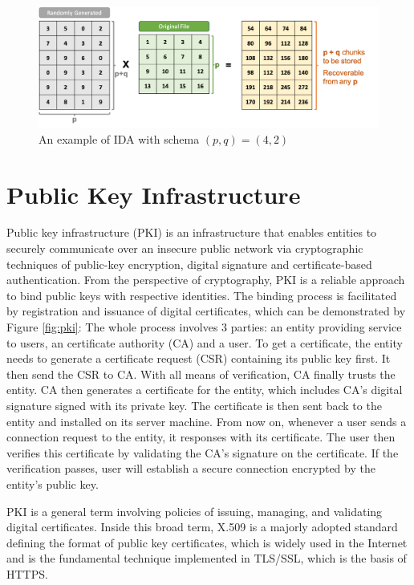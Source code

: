 \begin{figure}[hbt]
\centering
  \includegraphics[width=13cm]{figures/ida.png}
  \caption{An example of IDA with schema $(p,q)=(4,2)$}
  \label{fig:ida}
\end{figure}

\newpage

\section{Public Key Infrastructure}
\label{s:publickeyinfrastructure}

Public key infrastructure (PKI) is an infrastructure that enables entities to securely communicate over an insecure public network via cryptographic techniques of public-key encryption, digital signature and certificate-based authentication. From the perspective of cryptography, PKI is a reliable approach to bind public keys with respective identities. The binding process is facilitated by registration and issuance of digital certificates, which can be demonstrated by Figure \ref{fig:pki}: The whole process involves 3 parties: an entity providing service to users, an certificate authority (CA) and a user. To get a certificate, the entity needs to generate a certificate request (CSR) containing its public key first. It then send the CSR to CA. With all means of verification, CA finally trusts the entity. CA then generates a certificate for the entity, which includes CA's digital signature signed with its private key. The certificate is then sent back to the entity and installed on its server machine. From now on, whenever a user sends a connection request to the entity, it responses with its certificate. The user then verifies this certificate by validating the CA's signature on the certificate. If the verification passes, user will establish a secure connection encrypted by the entity's public key.

PKI is a general term involving policies of issuing, managing, and validating digital certificates. Inside this broad term, X.509\cite{rfc4158} is a majorly adopted standard defining the format of public key certificates, which is widely used in the Internet and is the fundamental technique implemented in TLS/SSL, which is the basis of HTTPS.

